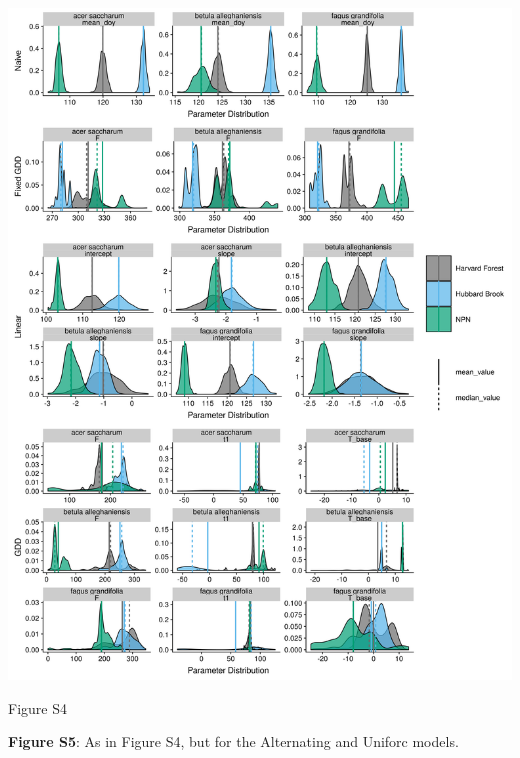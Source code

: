 \documentclass[a4paper,12pt]{article}
\begin{document}
\begin{center}
	\centering
		\includegraphics[scale=0.5]{supplement_hubbard_harvard_comparison1.png}
	\caption{Figure S4}
\end{center}

\newpage

\textbf{Figure S5}: As in Figure S4, but for the Alternating and Uniforc models. 

\newpage
\end{document}
